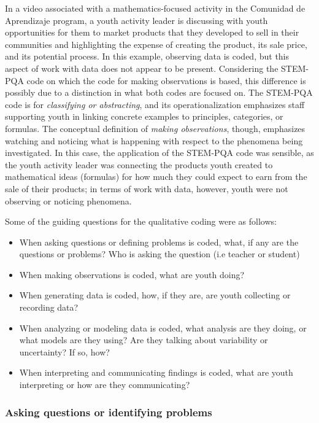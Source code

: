 \documentclass[]{book}
\providecommand{\tightlist}{%
  \setlength{\itemsep}{0pt}\setlength{\parskip}{0pt}}
\theoremstyle{definition}
\theoremstyle{definition}
\theoremstyle{definition}
\theoremstyle{remark}
\begin{document}
In a video associated with a mathematics-focused activity in the
Comunidad de Aprendizaje program, a youth activity leader is discussing
with youth opportunities for them to market products that they developed
to sell in their communities and highlighting the expense of creating
the product, its sale price, and its potential process. In this example,
observing data is coded, but this aspect of work with data does not
appear to be present. Considering the STEM-PQA code on which the code
for making observations is based, this difference is possibly due to a
distinction in what both codes are focused on. The STEM-PQA code is for
\emph{classifying or abstracting}, and its operationalization emphasizes
staff supporting youth in linking concrete examples to principles,
categories, or formulas. The conceptual definition of \emph{making
observations}, though, emphasizes watching and noticing what is
happening with respect to the phenomena being investigated. In this
case, the application of the STEM-PQA code was sensible, as the youth
activity leader was connecting the products youth created to
mathematical ideas (formulas) for how much they could expect to earn
from the sale of their products; in terms of work with data, however,
youth were not observing or noticing phenomena.

Some of the guiding questions for the qualitative coding were as
follows:

\begin{itemize}
\tightlist
\item
  When asking questions or defining problems is coded, what, if any are
  the questions or problems? Who is asking the question (i.e teacher or
  student)
\item
  When making observations is coded, what are youth doing?
\item
  When generating data is coded, how, if they are, are youth collecting
  or recording data?
\item
  When analyzing or modeling data is coded, what analysis are they
  doing, or what models are they using? Are they talking about
  variability or uncertainty? If so, how?
\item
  When interpreting and communicating findings is coded, what are youth
  interpreting or how are they communicating?
\end{itemize}

\subsubsection{Asking questions or identifying
problems}\label{asking-questions-or-identifying-problems}
\end{document}
